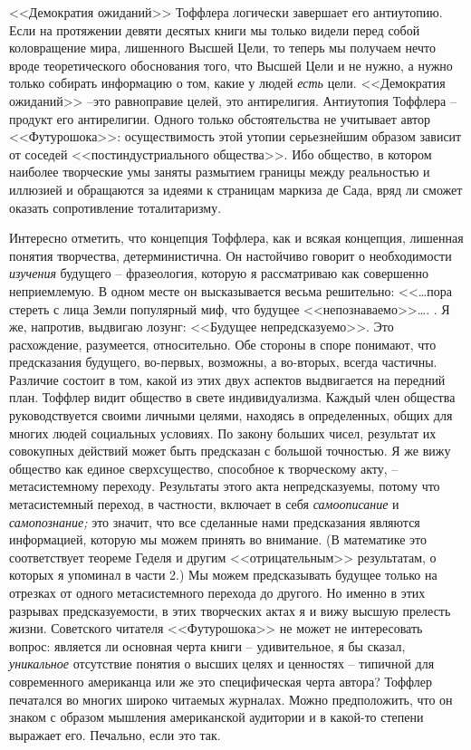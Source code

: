 \documentclass{book}
\begin{document}
<<Демократия ожиданий>> Тоффлера логически завершает его антиутопию. Если на протяжении девяти десятых книги мы только видели перед собой коловращение мира, лишенного Высшей Цели, то теперь мы получаем нечто вроде теоретиче­ского обоснования того, что Высшей Цели и не нужно, а нужно только собирать информацию о том, какие у людей \textit{есть}  цели. <<Демократия ожиданий>> --это равноправие целей, это анти­религия. Антиутопия Тоффлера -- продукт его антирелигии. Одного только обстоятельства не учитывает автор <<Футурошока>>: осуществимость этой утопии серьезнейшим образом за­висит от соседей <<постиндустриального общества>>. Ибо общест­во, в котором наиболее творческие умы заняты размытием гра­ницы между реальностью и иллюзией и обращаются за идеями к страницам маркиза де Сада, вряд ли сможет оказать сопротив­ление тоталитаризму.

Интересно отметить, что концепция Тоффлера, как и всякая концепция, лишенная понятия творчества, детерминистична. Он настойчиво говорит о необходимости \textit{изучения}  будущего -- фразеология, которую я рассматриваю как совершенно непри­емлемую. В одном месте он высказывается весьма решитель­но: <<\ldots пора стереть с лица Земли популярный миф, что буду­щее <<непознаваемо>>\ldots.%
.
Я же, напротив, выдвигаю лозунг: <<Будущее непредсказуемо>>. Это расхождение, разумеется, от­носительно. Обе стороны в споре понимают, что предсказания будущего, во-первых, возможны, а во-вторых, всегда частичны. Различие состоит в том, какой из этих двух аспектов выд­вигается на передний план. Тоффлер видит общество в свете индивидуализма. Каждый член общества руководствуется своими личными целями, находясь в определенных, общих для многих людей социальных условиях. По закону больших чисел, результат их совокупных действий может быть предсказан с большой точностью. Я же вижу общество как единое сверх­существо, способное к 
творческому 
акту, -- метасистемному пе­реходу. Результаты этого акта непредсказуемы, потому что метасистемный переход, в частности, включает в себя \textit{самоописа­ние}  и \textit{самопознание;}  это значит, что все сделанные нами пред­сказания являются информацией, которую мы можем принять во внимание. (В математике это соответствует теореме Геделя и другим <<отрицательным>> результатам, о которых я упоминал в части 2.) Мы можем предсказывать будущее только на отрез­ках от одного метасистемного перехода до другого. Но именно в этих разрывах предсказуемости, в этих творческих актах я и вижу высшую прелесть жизни.
Советского читателя <<Футурошока>> не может не интересо­вать вопрос: является ли основная черта книги -- удивительное, я бы сказал, \textit{уникальное}  отсутствие понятия о высших целях и ценностях -- типичной для современного американца или же это специфическая черта автора? Тоффлер печатался во многих широко читаемых журналах. Можно предположить, что он зна­ком с образом мышления американской аудитории и в какой-то степени выражает его. Печально, если это так.
\end{document}
